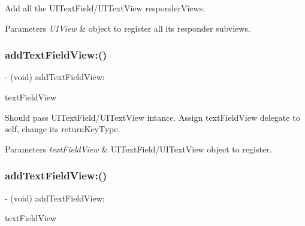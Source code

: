 Add all the U\+I\+Text\+Field/\+U\+I\+Text\+View responder\+View\textquotesingle{}s.


\begin{DoxyParams}{Parameters}
{\em U\+I\+View} & object to register all it\textquotesingle{}s responder subviews. \\
\hline
\end{DoxyParams}
\mbox{\label{interface_i_q_keyboard_return_key_handler_afbac480817c07157f820e34b08a5db70}} 
\subsubsection{\texorpdfstring{add\+Text\+Field\+View\+:()}{addTextFieldView:()}\hspace{0.1cm}{\footnotesize\ttfamily [1/3]}}
{\footnotesize\ttfamily -\/ (void) add\+Text\+Field\+View\+: \begin{DoxyParamCaption}\item[{(nonnull U\+I\+View $\ast$)}]{text\+Field\+View }\end{DoxyParamCaption}}

Should pass U\+I\+Text\+Field/\+U\+I\+Text\+View intance. Assign text\+Field\+View delegate to self, change it\textquotesingle{}s return\+Key\+Type.


\begin{DoxyParams}{Parameters}
{\em text\+Field\+View} & U\+I\+Text\+Field/\+U\+I\+Text\+View object to register. \\
\hline
\end{DoxyParams}
\mbox{\label{interface_i_q_keyboard_return_key_handler_afbac480817c07157f820e34b08a5db70}} 
\subsubsection{\texorpdfstring{add\+Text\+Field\+View\+:()}{addTextFieldView:()}\hspace{0.1cm}{\footnotesize\ttfamily [2/3]}}
{\footnotesize\ttfamily -\/ (void) add\+Text\+Field\+View\+: \begin{DoxyParamCaption}\item[{(nonnull U\+I\+View $\ast$)}]{text\+Field\+View }\end{DoxyParamCaption}}


